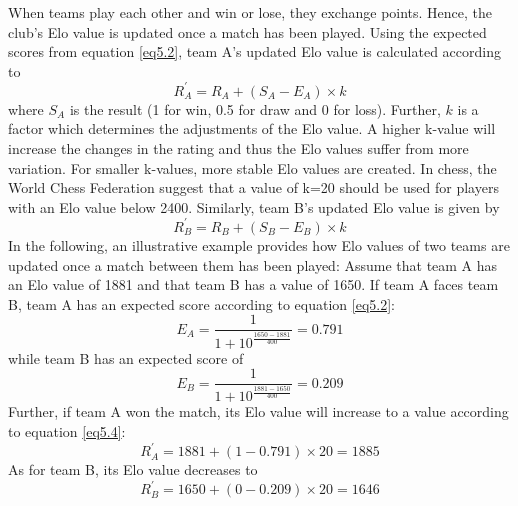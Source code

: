 \newpar
When teams play each other and win or lose, they exchange points. Hence, the club's Elo value is updated once a match has been played. Using the expected scores from equation \ref{eq5.2}, team A's updated Elo value is calculated according to
\begin{equation} \label{eq5.4}
    R^{'}_A = R_A + (S_A-E_A) \times k
\end{equation}
where $S_A$ is the result (1 for win, 0.5 for draw and 0 for loss). Further, $k$ is a factor which determines the adjustments of the Elo value. A higher k-value will increase the changes in the rating and thus the Elo values suffer from more variation. For smaller k-values, more stable Elo values are created. In chess, the World Chess Federation suggest that a value of k=20 should be used for players with an Elo value below 2400. 
\newpar
Similarly, team B's updated Elo value is given by
\begin{equation} \label{eq5.5}
    R^{'}_B = R_B + (S_B-E_B) \times k
\end{equation}
\newpar
In the following, an illustrative example provides how Elo values of two teams are updated once a match between them has been played:
\newpar
Assume that team A has an Elo value of 1881 and that team B has a value of 1650. If team A faces team B, team A has an expected score according to equation \ref{eq5.2}:
\begin{equation*}
    E_A = \frac{1}{1+10^{\frac{1650-1881}{400}}} = 0.791
\end{equation*}
while team B has an expected score of
\begin{equation*}
    E_B = \frac{1}{1+10^{\frac{1881-1650}{400}}} = 0.209
\end{equation*}
Further, if team A won the match, its Elo value will increase to a value according to equation \ref{eq5.4}: 
\begin{equation*}
   R^{'}_A= 1881 + (1-0.791) \times 20 = 1885
\end{equation*}
As for team B, its Elo value decreases to
\begin{equation*}
   R^{'}_B = 1650 + (0-0.209) \times 20 = 1646 
\end{equation*}


